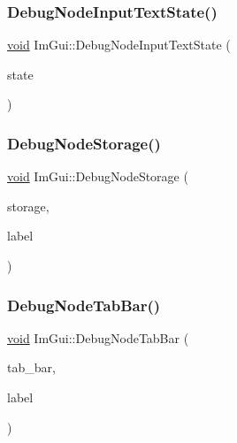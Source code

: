 \mbox{\label{namespaceImGui_ab85df47e899ab32dbdd5089f40e3802f}} 
\subsubsection{\texorpdfstring{Debug\+Node\+Input\+Text\+State()}{DebugNodeInputTextState()}}
{\footnotesize\ttfamily \hyperlink{imgui__impl__opengl3__loader_8h_ac668e7cffd9e2e9cfee428b9b2f34fa7}{void} Im\+Gui\+::\+Debug\+Node\+Input\+Text\+State (\begin{DoxyParamCaption}\item[{\hyperlink{structImGuiInputTextState}{Im\+Gui\+Input\+Text\+State} $\ast$}]{state }\end{DoxyParamCaption})}

\mbox{\label{namespaceImGui_a8e1aae1a79042976013f36d7f2e7ee70}} 
\subsubsection{\texorpdfstring{Debug\+Node\+Storage()}{DebugNodeStorage()}}
{\footnotesize\ttfamily \hyperlink{imgui__impl__opengl3__loader_8h_ac668e7cffd9e2e9cfee428b9b2f34fa7}{void} Im\+Gui\+::\+Debug\+Node\+Storage (\begin{DoxyParamCaption}\item[{\hyperlink{structImGuiStorage}{Im\+Gui\+Storage} $\ast$}]{storage,  }\item[{const char $\ast$}]{label }\end{DoxyParamCaption})}

\mbox{\label{namespaceImGui_ac5f1a2b50c26c83d3df78d94e95f0bd0}} 
\subsubsection{\texorpdfstring{Debug\+Node\+Tab\+Bar()}{DebugNodeTabBar()}}
{\footnotesize\ttfamily \hyperlink{imgui__impl__opengl3__loader_8h_ac668e7cffd9e2e9cfee428b9b2f34fa7}{void} Im\+Gui\+::\+Debug\+Node\+Tab\+Bar (\begin{DoxyParamCaption}\item[{\hyperlink{structImGuiTabBar}{Im\+Gui\+Tab\+Bar} $\ast$}]{tab\+\_\+bar,  }\item[{const char $\ast$}]{label }\end{DoxyParamCaption})}

